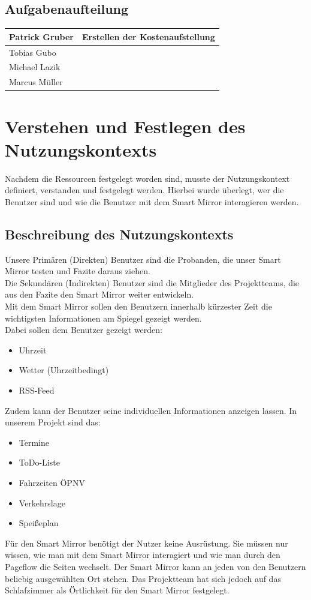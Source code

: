 \documentclass[12pt, a4paper]{scrartcl}
\begin{document}
	\subsection*{Aufgabenaufteilung}
	\begin{tabularx}{0.95\textwidth}{|l|X|}
		\hline
		Patrick Gruber & Erstellen der Kostenaufstellung\\
		\hline
		Tobias Gubo & \\
		\hline
		Michael Lazik & \\
		\hline
		Marcus Müller & \\
		\hline
	\end{tabularx}
	
	\newpage
	
	\section{Verstehen und Festlegen des Nutzungskontexts}
	Nachdem die Ressourcen festgelegt worden sind, musste der Nutzungskontext definiert, verstanden und festgelegt werden. Hierbei wurde überlegt, wer die Benutzer sind und wie die Benutzer mit dem Smart Mirror interagieren werden.
	\subsection{Beschreibung des Nutzungskontexts}
	Unsere Primären (Direkten) Benutzer sind die Probanden, die unser Smart Mirror testen und Fazite daraus ziehen.\\
	Die Sekundären (Indirekten) Benutzer sind die Mitglieder des Projektteams, die aus den Fazite den Smart Mirror weiter entwickeln.\\
	Mit dem Smart Mirror sollen den Benutzern innerhalb kürzester Zeit die wichtigsten Informationen am Spiegel gezeigt werden.\\
	Dabei sollen dem Benutzer gezeigt werden:
	\begin{itemize}
		\setlength\itemsep{-0.5em}
		\item Uhrzeit
		\item Wetter (Uhrzeitbedingt)
		\item RSS-Feed
	\end{itemize}
	Zudem kann der Benutzer seine individuellen Informationen anzeigen lassen. In unserem Projekt sind das:
	\begin{itemize}
		\setlength\itemsep{-0.5em}
		\item Termine
		\item  ToDo-Liste
		\item Fahrzeiten ÖPNV
		\item Verkehrslage
		\item Speißeplan
	\end{itemize}
	Für den Smart Mirror benötigt der Nutzer keine Ausrüstung. Sie müssen nur wissen, wie man mit dem Smart Mirror interagiert und wie man durch den Pageflow die Seiten wechselt. Der Smart Mirror kann an jeden von den Benutzern beliebig ausgewählten Ort stehen. Das Projektteam hat sich jedoch auf das Schlafzimmer als Örtlichkeit für den Smart Mirror festgelegt.\\
	
\end{document}
